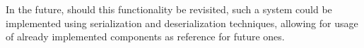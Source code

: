In the future, should this functionality be revisited, such a system could be implemented using serialization and deserialization techniques, allowing for usage of already implemented components as reference for future ones.





